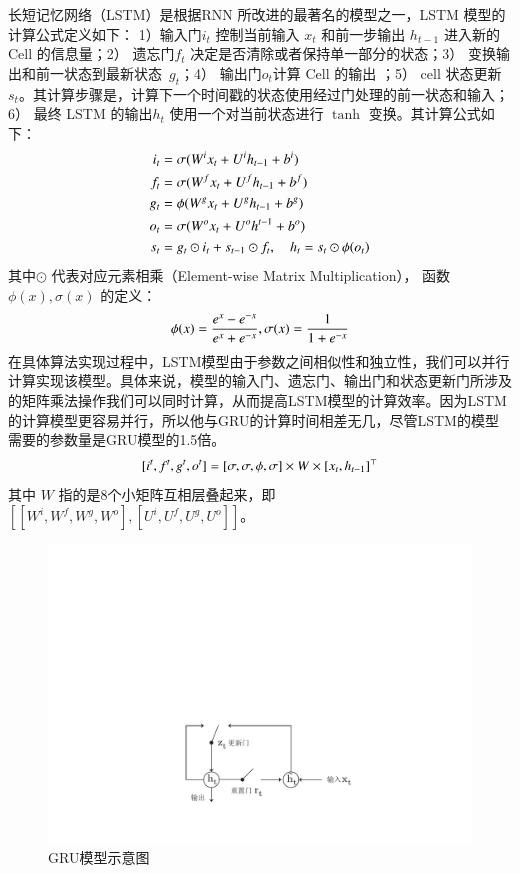长短记忆网络（LSTM）是根据RNN 所改进的最著名的模型之一，LSTM 模型的计算公式定义如下： 1）输入门$i_t$ 控制当前输入 $x_t$ 和前一步输出 $h_{t−1}$ 进入新的 Cell 的信息量；2） 遗忘门$f_t$ 决定是否清除或者保持单一部分的状态；3） 变换输出和前一状态到最新状态~$g_t$；4） 输出门$o_t$计算 Cell 的输出 ；5） cell 状态更新$s_t$。其计算步骤是，计算下一个时间戳的状态使用经过门处理的前一状态和输入；6） 最终 LSTM 的输出$h_t$ 使用一个对当前状态进行 $\tanh$ 变换。其计算公式如下：
\begin{equation}\label{equ:lstm}
\setlength{\abovedisplayskip}{10pt}
\setlength{\belowdisplayskip}{10pt}
\begin{split}
   i_t&=\sigma(W^i x_t+U^i h_{t-1}+b^i) \\
   f_t&=\sigma(W^f x_t+U^f h_{t-1}+b^f) \\
   g_t&=\phi(W^g x_t+U^g h_{t-1}+b^g) \\
   o_t&=\sigma(W^o x_t+U^o h^{t-1}+b^o) \\
   s_t&=g_t\odot i_t+s_{t-1}\odot f_t,\quad h_t=s_t\odot \phi(o_t)
\end{split}
\end{equation}
其中$\odot$ 代表对应元素相乘（Element-wise Matrix Multiplication）， 函数 $\phi(x), \sigma(x)$ 的定义：
\begin{equation}\label{equ:tanh}
\setlength{\abovedisplayskip}{10pt}
\setlength{\belowdisplayskip}{10pt}
  \phi(x)=\frac{e^x-e^{-x}}{e^x+e^{-x}},\sigma(x)=\frac{1}{1+e^{-x}}
\end{equation}
在具体算法实现过程中，LSTM模型由于参数之间相似性和独立性，我们可以并行计算实现该模型。具体来说，模型的输入门、遗忘门、输出门和状态更新门所涉及的矩阵乘法操作我们可以同时计算，从而提高LSTM模型的计算效率。因为LSTM的计算模型更容易并行，所以他与GRU的计算时间相差无几，尽管LSTM的模型需要的参数量是GRU模型的1.5倍。
\begin{equation}\label{equ:weight}
\setlength{\abovedisplayskip}{10pt}
\setlength{\belowdisplayskip}{10pt}
[i^t,f^t,g^t,o^t ]=[\sigma, \sigma,\phi,\sigma]\times W\times[x_t,h_{t-1}]^\top
\end{equation}
其中 $W$ 指的是8个小矩阵互相层叠起来，即 $[[W^i,W^f,W^g,W^o],[U^i,U^f,U^g,U^o]]$。


\begin{figure}[!t]
  \centering
  \includegraphics[width=0.6\linewidth]{./figures/gru.pdf}
  \caption{GRU模型示意图}\label{fig:gru}
\end{figure}

